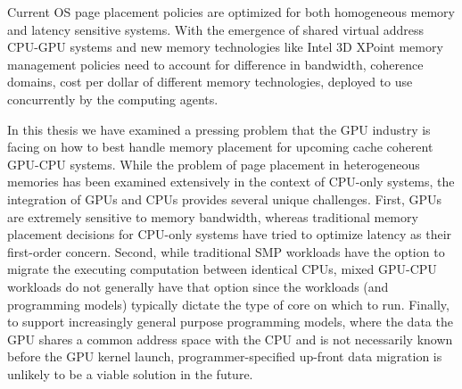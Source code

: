 Current OS page placement policies are optimized for both homogeneous memory and
latency sensitive systems. With the emergence of shared virtual address CPU-GPU
systems and new memory technologies like Intel 3D XPoint memory management
policies need to account for difference in bandwidth, coherence domains, cost
per dollar of different memory technologies, deployed to use concurrently by the
computing agents.

In this thesis we have examined a pressing problem that the GPU industry is
facing on how to best handle memory placement for upcoming cache coherent
GPU-CPU systems.  While the problem of page placement in heterogeneous memories
has been examined extensively in the context of CPU-only systems, the
integration of GPUs and CPUs provides several unique challenges.  First, GPUs
are extremely sensitive to memory bandwidth, whereas traditional memory
placement decisions for CPU-only systems have tried to optimize latency as their
first-order concern.  Second, while traditional SMP workloads have the option to
migrate the executing computation between identical CPUs, mixed GPU-CPU
workloads do not generally have that option since the workloads (and programming
models) typically dictate the type of core on which to run.  
Finally, to support increasingly general purpose programming models, where the
data the GPU shares a common address space with the CPU and is not necessarily
known before the GPU kernel launch, programmer-specified up-front data migration
is unlikely to be a viable solution in the future.

